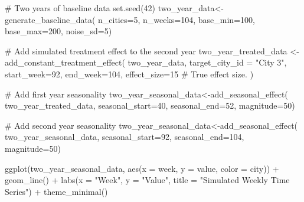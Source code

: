 \documentclass[
  letterpaper,
  DIV=11,
  numbers=noendperiod]{scrreprt}
\newenvironment{Shaded}{\begin{snugshade}}{\end{snugshade}}
\newcommand{\AttributeTok}[1]{\textcolor[rgb]{0.40,0.45,0.13}{#1}}
\newcommand{\CommentTok}[1]{\textcolor[rgb]{0.37,0.37,0.37}{#1}}
\newcommand{\DecValTok}[1]{\textcolor[rgb]{0.68,0.00,0.00}{#1}}
\newcommand{\FunctionTok}[1]{\textcolor[rgb]{0.28,0.35,0.67}{#1}}
\newcommand{\NormalTok}[1]{\textcolor[rgb]{0.00,0.23,0.31}{#1}}
\newcommand{\OtherTok}[1]{\textcolor[rgb]{0.00,0.23,0.31}{#1}}
\newcommand{\SpecialCharTok}[1]{\textcolor[rgb]{0.37,0.37,0.37}{#1}}
\newcommand{\StringTok}[1]{\textcolor[rgb]{0.13,0.47,0.30}{#1}}
\begin{document}
\begin{Shaded}
\begin{Highlighting}[]
\CommentTok{\# Two years of baseline data}
\FunctionTok{set.seed}\NormalTok{(}\DecValTok{42}\NormalTok{)}
\NormalTok{two\_year\_data}\OtherTok{\textless{}{-}}\FunctionTok{generate\_baseline\_data}\NormalTok{(}
  \AttributeTok{n\_cities=}\DecValTok{5}\NormalTok{,}
  \AttributeTok{n\_weeks=}\DecValTok{104}\NormalTok{,}
  \AttributeTok{base\_min=}\DecValTok{100}\NormalTok{,}
  \AttributeTok{base\_max=}\DecValTok{200}\NormalTok{,}
  \AttributeTok{noise\_sd=}\DecValTok{5}\NormalTok{)}

\CommentTok{\# Add simulated treatment effect to the second year}
\NormalTok{two\_year\_treated\_data }\OtherTok{\textless{}{-}} \FunctionTok{add\_constant\_treatment\_effect}\NormalTok{(}
\NormalTok{  two\_year\_data,}
  \AttributeTok{target\_city\_id =} \StringTok{"City 3"}\NormalTok{,}
  \AttributeTok{start\_week=}\DecValTok{92}\NormalTok{,}
  \AttributeTok{end\_week=}\DecValTok{104}\NormalTok{,}
  \AttributeTok{effect\_size=}\DecValTok{15} \CommentTok{\# True effect size.}
\NormalTok{)}

\CommentTok{\# Add first year seasonality}
\NormalTok{two\_year\_seasonal\_data}\OtherTok{\textless{}{-}}\FunctionTok{add\_seasonal\_effect}\NormalTok{(}
\NormalTok{  two\_year\_treated\_data,}
  \AttributeTok{seasonal\_start=}\DecValTok{40}\NormalTok{,}
  \AttributeTok{seasonal\_end=}\DecValTok{52}\NormalTok{,}
  \AttributeTok{magnitude=}\DecValTok{50}\NormalTok{)}

\CommentTok{\# Add second year seasonality}
\NormalTok{two\_year\_seasonal\_data}\OtherTok{\textless{}{-}}\FunctionTok{add\_seasonal\_effect}\NormalTok{(}
\NormalTok{  two\_year\_seasonal\_data,}
  \AttributeTok{seasonal\_start=}\DecValTok{92}\NormalTok{,}
  \AttributeTok{seasonal\_end=}\DecValTok{104}\NormalTok{,}
  \AttributeTok{magnitude=}\DecValTok{50}\NormalTok{)}


\FunctionTok{ggplot}\NormalTok{(two\_year\_seasonal\_data, }\FunctionTok{aes}\NormalTok{(}\AttributeTok{x =}\NormalTok{ week, }\AttributeTok{y =}\NormalTok{ value, }\AttributeTok{color =}\NormalTok{ city)) }\SpecialCharTok{+}
  \FunctionTok{geom\_line}\NormalTok{() }\SpecialCharTok{+}
  \FunctionTok{labs}\NormalTok{(}\AttributeTok{x =} \StringTok{"Week"}\NormalTok{, }\AttributeTok{y =} \StringTok{"Value"}\NormalTok{, }\AttributeTok{title =} \StringTok{"Simulated Weekly Time Series"}\NormalTok{) }\SpecialCharTok{+}
  \FunctionTok{theme\_minimal}\NormalTok{()}
\end{Highlighting}
\end{Shaded}
\end{document}
